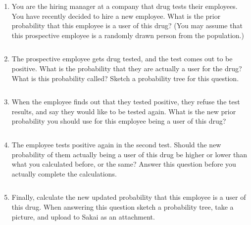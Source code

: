 \documentclass[12pt]{article}
\newcommand{\soln}[2]{$\:$\\ \vspace{#1}}{}
\begin{document}
\begin{enumerate}

\item You are the hiring manager at a company that drug tests their employees. You have recently decided to hire a new employee. What is the prior probability that this employee is a user of this drug? (You may assume that this prospective employee is a randomly drawn person from the population.)

\soln{1cm}{P(drug user) = 0.05}

\item The prospective employee gets drug tested, and the test comes out to be positive. What is the probability that they are actually a user for the drug? What is this probability called? Sketch a probability tree for this question.

\soln{6cm}{P(drug user $|$ +) $\rightarrow$ posterior probability\\
\begin{minipage}[c]{0.7\textwidth}
\texttt{[image: figures/test1.pdf]}
\end{minipage}
\begin{minipage}[c]{0.3\textwidth}
\begin{align*}
&P(drug~user~|~+) \\
&= \frac{P(drug~user~AND~+)}{P(+)} \\
&= \frac{0.0485}{0.0485 + 0.076} \\
&\approx 0.39
\end{align*}
\end{minipage}
}

\pagebreak

\item When the employee finds out that they tested positive, they refuse the test results, and say they would like to be tested again. What is the new prior probability you should use for this employee being a user of this drug?

\soln{1cm}{P(drug user) = 0.39}

\item The employee tests positive again in the second test. Should the new probability of them actually being a user of this drug be higher or lower than what you calculated before, or the same? Answer this question before you actually complete the calculations.

\soln{1cm}{Higher.}

\item Finally, calculate the new updated probability that this employee is a user of this drug. When answering this question sketch a probability tree, take a picture, and upload to Sakai as an attachment.


\end{enumerate}
\end{document}
